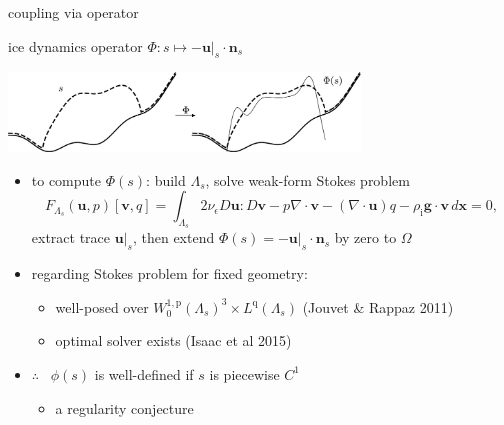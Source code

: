 \documentclass[usepdftitle=false,usenames,dvipsnames]{beamer}
\newcommand{\eps}{\epsilon}
\newcommand{\Div}{\nabla\cdot}
\newcommand{\bg}{\mathbf{g}}
\newcommand{\bn}{\mathbf{n}}
\newcommand{\bu}{\mathbf{u}}
\newcommand{\bv}{\mathbf{v}}
\newcommand{\bx}{\mathbf{x}}
\newcommand{\rhoi}{\rho_{\text{i}}}
\newcommand{\pp}{{\text{p}}}
\newcommand{\qq}{{\text{q}}}
\newcommand{\bus}{\bu|_s}
\begin{document}
\begin{frame}{coupling via operator}

\begin{block}{ice dynamics operator}
$\Phi : s \mapsto - \bus \cdot \bn_s$

\vspace{-3mm}

\hfill \includegraphics[width=0.7\textwidth]{figs/idoaction.png}
\end{block}

\begin{itemize}
\item to compute $\Phi(s)$: build $\Lambda_s$, solve weak-form Stokes problem
    $$F_{\Lambda_s}(\bu,p)[\bv,q] = \int_{\Lambda_s} 2 \nu_\eps D\bu : D\bv - p \Div\bv - (\Div\bu) q - \rhoi \bg \cdot \bv\,d\bx = 0,$$
extract trace $\bus$, then extend $\Phi(s) = -\bus \cdot \bn_s$ by zero to $\Omega$
\item regarding Stokes problem for fixed geometry:
    \begin{itemize}
    \item well-posed over $W_0^{1,\pp}(\Lambda_s)^3 \times L^\qq(\Lambda_s)$ (Jouvet \& Rappaz 2011)
    \item optimal solver exists (Isaac et al 2015)
    \end{itemize}
\item $\therefore$ \, $\phi(s)$ is well-defined if $s$ is piecewise $C^1$
    \begin{itemize}
    \item a regularity conjecture
    \end{itemize}
\end{itemize}

\end{frame}
\end{document}
